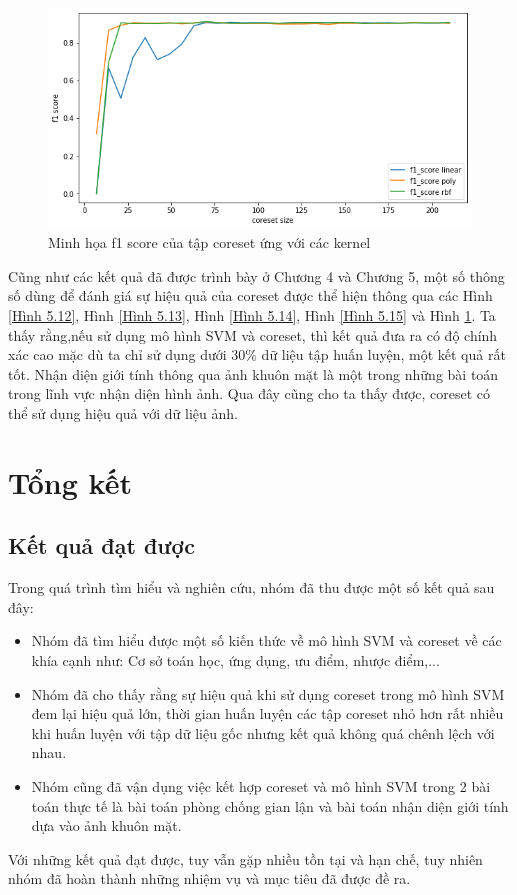 \documentclass[a4paper, 12pt, oneside]{report}
\begin{document}
\begin{center}
    \begin{figure}[H]
    \begin{center}
     \includegraphics[scale=0.5]{f1_score_AR_gender.png}
    \end{center}
     \caption{Minh họa f1 score của tập coreset ứng với các kernel}
    \label{Hình 5.16}
    \end{figure}
\end{center}
Cũng như các kết quả đã được trình bày ở Chương 4 và Chương 5, một số thông số dùng để đánh giá sự hiệu quả của coreset được thể hiện thông qua các Hình \ref{Hình 5.12}, Hình \ref{Hình 5.13}, Hình \ref{Hình 5.14}, Hình \ref{Hình 5.15} và Hình \ref{Hình 5.16}. Ta thấy rằng,nếu sử dụng mô hình SVM và coreset, thì kết quả đưa ra có độ chính xác cao mặc dù ta chỉ sử dụng dưới 30\% dữ liệu tập huấn luyện, một kết quả rất tốt. Nhận diện giới tính thông qua ảnh khuôn mặt là một trong những bài toán trong lĩnh vực nhận diện hình ảnh. Qua đây cũng cho ta thấy được, coreset có thể sử dụng hiệu quả với dữ liệu ảnh. 

\newpage
\chapter{Tổng kết}
\section{Kết quả đạt được}
Trong quá trình tìm hiểu và nghiên cứu, nhóm đã thu được một số kết quả sau đây:
\begin{itemize}
    \item Nhóm đã tìm hiểu được một số kiến thức về mô hình SVM và coreset về các khía cạnh như: Cơ sở toán học, ứng dụng, ưu điểm, nhược điểm,...
    \item Nhóm đã cho thấy rằng sự hiệu quả khi sử dụng coreset trong mô hình SVM đem lại hiệu quả lớn, thời gian huấn luyện các tập coreset nhỏ hơn rất nhiều khi huấn luyện với tập dữ liệu gốc nhưng kết quả không quá chênh lệch với nhau.
    \item Nhóm cũng đã vận dụng việc kết hợp coreset và mô hình SVM trong 2 bài toán thực tế là bài toán phòng chống gian lận và bài toán nhận diện giới tính dựa vào ảnh khuôn mặt.
\end{itemize}
Với những kết quả đạt được, tuy vẫn gặp nhiều tồn tại và hạn chế, tuy nhiên nhóm đã hoàn thành những nhiệm vụ và mục tiêu đã được đề ra.
\end{document}
